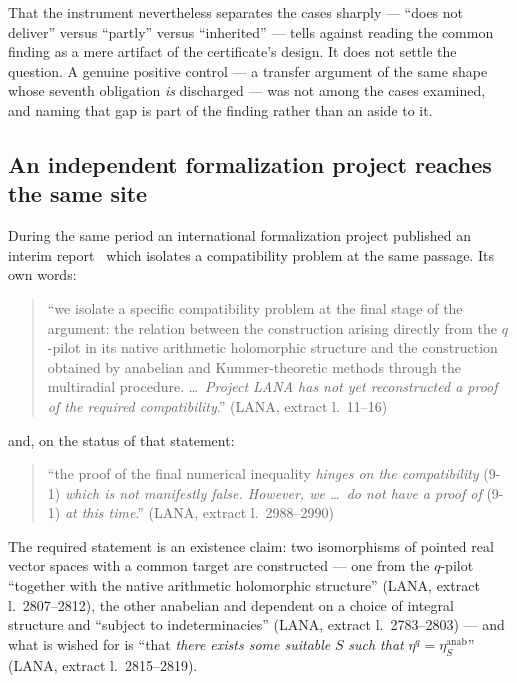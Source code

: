 \documentclass[11pt,a4paper]{article}
\theoremstyle{definition}
\newcommand{\anchor}[2]{(#1, extract l.~#2)}
\begin{document}
That the instrument nevertheless separates the cases sharply --- ``does not
deliver'' versus ``partly'' versus ``inherited'' --- tells against reading the
common finding as a mere artifact of the certificate's design. It does not settle
the question. A genuine positive control --- a transfer argument of the same shape
whose seventh obligation \emph{is} discharged --- was not among the cases examined,
and naming that gap is part of the finding rather than an aside to it.

\subsection{An independent formalization project reaches the same site}

During the same period an international formalization project published an interim
report~\cite{LANA2026} which isolates a compatibility problem at the same passage.
Its own words:

\begin{quote}\small
``we isolate a specific compatibility problem at the final stage of the argument:
the relation between the construction arising directly from the $q$-pilot in its
native arithmetic holomorphic structure and the construction obtained by anabelian
and Kummer-theoretic methods through the multiradial procedure. \dots\
\emph{Project LANA has not yet reconstructed a proof of the required
compatibility}.'' \hfill\anchor{LANA}{11--16}
\end{quote}

and, on the status of that statement:

\begin{quote}\small
``the proof of the final numerical inequality \emph{hinges on the compatibility}
(9-1) \emph{which is not manifestly false. However, we \dots\ do not have a proof
of} (9-1) \emph{at this time}.'' \hfill\anchor{LANA}{2988--2990}
\end{quote}

The required statement is an existence claim: two isomorphisms of pointed real
vector spaces with a common target are constructed --- one from the $q$-pilot
``together with the native arithmetic holomorphic structure''
\anchor{LANA}{2807--2812}, the other anabelian and dependent on a choice of
integral structure and ``subject to indeterminacies'' \anchor{LANA}{2783--2803}
--- and what is wished for is ``that \emph{there exists some suitable} $S$
\emph{such that} $\eta^q = \eta_S^{\mathrm{anab}}$'' \anchor{LANA}{2815--2819}.
\end{document}
